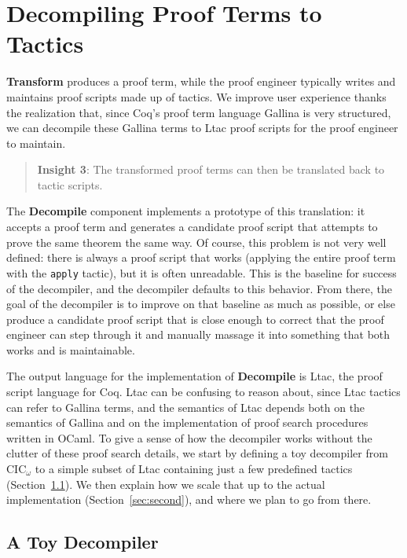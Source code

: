 \section{Decompiling Proof Terms to Tactics}
\label{sec:decompiler}

\textbf{Transform} produces a proof term,
while the proof engineer typically writes and maintains proof scripts made up of tactics.
We improve user experience thanks the realization that, since Coq's proof term language Gallina is very structured,
we can decompile these Gallina terms to Ltac proof scripts for the proof engineer to maintain.

\begin{quote}
\textbf{Insight 3}: The transformed proof terms can then be translated back to tactic scripts.
\end{quote}

The \textbf{Decompile} component implements a prototype of this translation:
it accepts a proof term and generates a candidate proof script that attempts to prove the same theorem the same way.
Of course, this problem is not very well defined: there is always a proof script that 
works (applying the entire proof term with the \lstinline{apply} tactic), but it is often unreadable.
This is the baseline for success of the decompiler, and the decompiler defaults to this behavior.
From there, the goal of the decompiler is to improve on that baseline as much as possible,
or else produce a candidate proof script that is close enough to correct that the proof engineer can step through it
and manually massage it into something that both works and is maintainable.

The output language for the implementation of \textbf{Decompile} is Ltac, the proof script language for Coq.
Ltac can be confusing to reason about, since Ltac tactics can refer to Gallina terms, and the semantics of Ltac depends both on the
semantics of Gallina and on the implementation of proof search procedures written in OCaml.
To give a sense of how the decompiler works without the clutter of these proof search details, we start by defining a toy
decompiler from CIC$_{\omega}$ to a simple subset of Ltac containing just a few predefined tactics (Section~\ref{sec:first}).
We then explain how we scale that up to the actual implementation (Section~\ref{sec:second}), and where we plan to go from there.

\subsection{A Toy Decompiler}
\label{sec:first}

